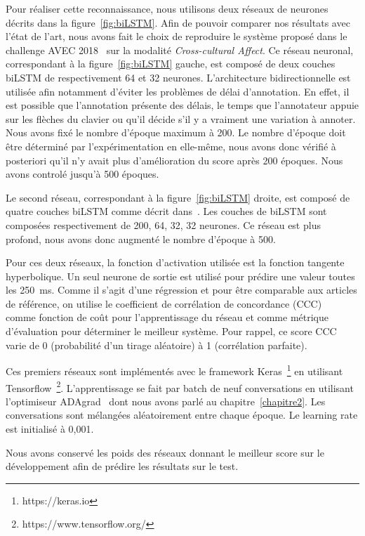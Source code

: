 Pour réaliser cette reconnaissance, nous utilisons deux réseaux de neurones décrits dans la figure~\ref{fig:biLSTM}. Afin de pouvoir comparer nos résultats avec l'état de l'art, nous avons fait le choix de reproduire le système proposé dans le challenge AVEC 2018~\cite{AVEC2018} sur la modalité \textit{Cross-cultural Affect}. Ce réseau neuronal, correspondant à la figure~\ref{fig:biLSTM} gauche, est composé de deux couches biLSTM de respectivement 64 et 32 neurones. L'architecture bidirectionnelle est utilisée afin notamment d'éviter les problèmes de délai d'annotation. En effet, il est possible que l'annotation présente des délais, le temps que l'annotateur appuie sur les flèches du clavier ou qu'il décide s'il y a vraiment une variation à annoter. Nous avons fixé le nombre d'époque maximum à 200. Le nombre d'époque doit être déterminé par l'expérimentation en elle-même, nous avons donc vérifié à posteriori qu'il n'y avait plus d'amélioration du score après 200 époques. Nous avons controlé jusqu'à 500 époques.

Le second réseau, correspondant à la figure~\ref{fig:biLSTM} droite, est composé de quatre couches biLSTM comme décrit dans~\cite{Schmitt2019}. Les couches de biLSTM sont composées respectivement de 200, 64, 32, 32 neurones. Ce réseau est plus profond, nous avons donc augmenté le nombre d'époque à 500.

Pour ces deux réseaux, la fonction d'activation utilisée est la fonction tangente hyperbolique. Un seul neurone de sortie est utilisé pour prédire une valeur toutes les 250~ms. Comme il s'agit d'une régression et pour être comparable aux articles de référence, on utilise le coefficient de corrélation de concordance (CCC)~\cite{CCC} comme fonction de coût pour l'apprentissage du réseau et comme métrique d'évaluation pour déterminer le meilleur système.
Pour rappel, ce score CCC varie de 0 (probabilité d'un tirage aléatoire) à 1 (corrélation parfaite).



Ces premiers réseaux sont implémentés avec le framework Keras~\footnote{https://keras.io} en utilisant Tensorflow~\footnote{https://www.tensorflow.org/}. L'apprentissage se fait par batch de neuf conversations en utilisant l'optimiseur ADAgrad~\cite{Duchi2011} dont nous avons parlé au chapitre~\ref{chapitre2}. Les conversations sont mélangées aléatoirement entre chaque époque. Le learning rate est initialisé à 0,001.

Nous avons conservé les poids des réseaux donnant le meilleur score sur le développement afin de prédire les résultats sur le test.


